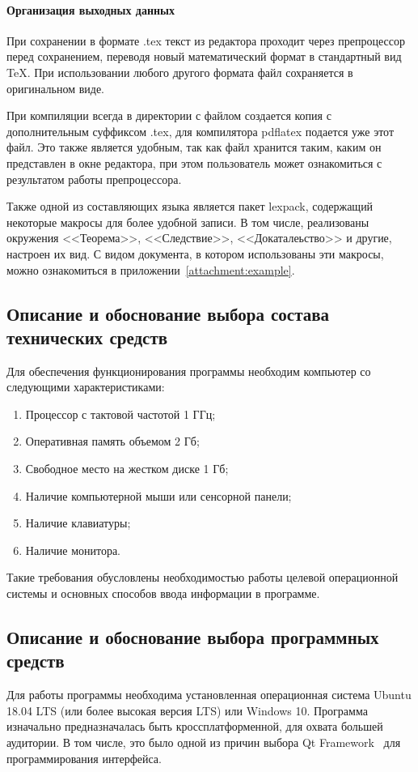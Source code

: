 \documentclass[explnote]{espd}
\begin{document}
\paragraph{Организация выходных данных}
При сохранении в формате .tex текст из редактора проходит через препроцессор перед сохранением, переводя новый математический формат в стандартный вид TeX. При использовании любого другого формата файл сохраняется в оригинальном виде.

При компиляции всегда в директории с файлом создается копия с дополнительным суффиксом .tex, для компилятора pdflatex подается уже этот файл. Это также является удобным, так как файл хранится таким, каким он представлен в окне редактора, при этом пользователь может ознакомиться с результатом работы препроцессора.

Также одной из составляющих языка является пакет lexpack, содержащий некоторые макросы для более удобной записи. В том числе, реализованы окружения <<Теорема>>, <<Следствие>>, <<Докаталеьство>> и другие, настроен их вид. С видом документа, в котором использованы эти макросы, можно ознакомиться в приложении~\ref{attachment:example}.

\subsection{Описание и обоснование выбора состава технических средств}
Для обеспечения функционирования программы необходим компьютер со следующими характеристиками:

\begin{enumerate}
\item Процессор с тактовой частотой 1 ГГц;
\item Оперативная память объемом 2 Гб;
\item Свободное место на жестком диске 1 Гб;
\item Наличие компьютерной мыши или сенсорной панели;
\item Наличие клавиатуры;
\item Наличие монитора.
\end{enumerate}

Такие требования обусловлены необходимостью работы целевой операционной системы и основных способов ввода информации в программе.

\subsection{Описание и обоснование выбора программных средств}
Для работы программы необходима установленная операционная система Ubuntu 18.04 LTS (или более высокая версия LTS) или Windows 10. Программа изначально предназначалась быть кроссплатформенной, для охвата большей аудитории. В том числе, это было одной из причин выбора Qt Framework~\cite{qt} для программирования интерфейса.
\end{document}
